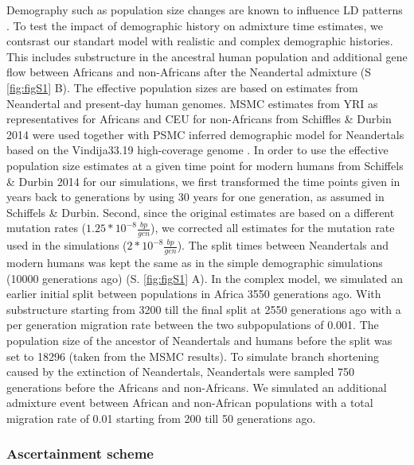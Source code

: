 \documentclass[]{article}
\begin{document}
Demography such as population size changes are known to influence LD
patterns \citep{gravel_population_2012,liang_lengths_2014}. To test the impact of
demographic history on admixture time estimates, we contsrast our standart model with
realistic and complex demographic histories. This includes substructure in the ancestral human population and additional gene flow between Africans and non-Africans after the Neandertal admixture (S \ref{fig:figS1} B). The 
effective population
sizes are based on estimates from Neandertal and present-day human
genomes. MSMC estimates from YRI as representatives for Africans and CEU
for non-Africans from Schiffles \& Durbin 2014
\citep{schiffels_inferring_2014} were used together with PSMC
\citep{li_inference_2011} inferred demographic model for Neandertals
based on the Vindija33.19 high-coverage genome
\citep{mafessoni_high_coverage_2020}. In order to use the effective
population size estimates at a given time point for modern humans from
Schiffels \& Durbin 2014 for our simulations, we
first transformed the time points given in years back to generations by
using 30 years for one generation, as assumed in Schiffels \& Durbin.
Second, since the original estimates are based on a different mutation
rates (\(1.25*10^{-8} \frac{bp}{gen}\)), we corrected all estimates for
the mutation rate used in the simulations
(\(2*10^{-8} \frac{bp}{gen}\)). The split times between Neandertals and
modern humans was kept the
same as in the simple demographic simulations (10000 generations ago) (S. \ref{fig:figS1} A). In the complex model, we simulated an earlier initial split between populations in Africa 3550 generations ago. With substructure starting from 3200 till the final split at 2550 generations ago with a per generation migration rate between the two subpopulations of 0.001. The population size of the ancestor of Neandertals and
humans before the split was set to 18296 (taken from the MSMC results). To simulate branch shortening
caused by the extinction of Neandertals, Neandertals were sampled 750
generations before the Africans and non-Africans. We simulated an additional admixture event between African and non-African populations with a total migration rate of 0.01 starting from 200 till 50 generations ago.



\subsubsection{Ascertainment scheme}\label{asceteinment scheme}
\end{document}
